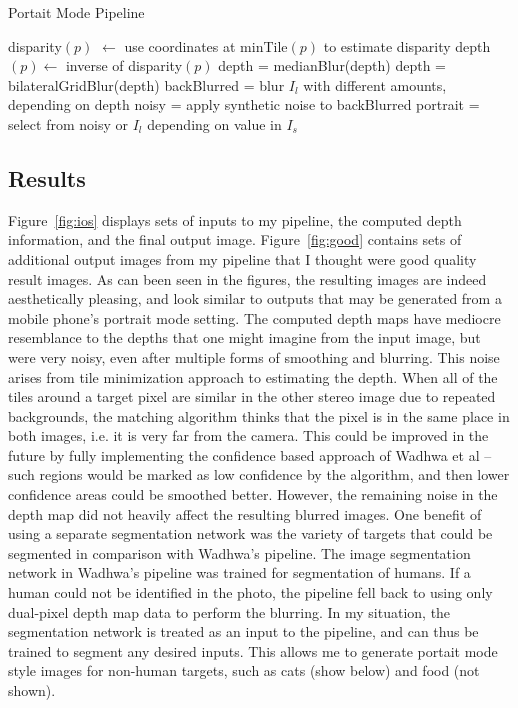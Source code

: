 \documentclass{article}
\begin{document}
\begin{algorithm}
\caption{Portait Mode Pipeline}
\label{alg:portrait}

    disparity$(p)$ $\gets$ use coordinates at minTile$(p)$ to estimate disparity \;
    depth$(p) \gets$ inverse of disparity$(p)$ \;
    depth = medianBlur(depth) \;
    depth = bilateralGridBlur(depth) \;
    backBlurred = blur $I_l$ with different amounts, depending on depth \;
    noisy = apply synthetic noise to backBlurred \;
    portrait = select from noisy or $I_l$ depending on value in $I_s$ \;
\end{algorithm}

\subsection{Results}

Figure~\ref{fig:ios} displays sets of inputs to my pipeline, the computed depth information, and the final output image.
%
Figure~\ref{fig:good} contains sets of additional output images from my pipeline that I thought were good quality result images.
%
As can been seen in the figures, the resulting images are indeed aesthetically pleasing, and look similar to outputs that may
be generated from a mobile phone's portrait mode setting.
%
The computed depth maps have mediocre resemblance to the depths that one might imagine from the input image, but were very noisy,
even after multiple forms of smoothing and blurring.
%
This noise arises from tile minimization approach to estimating the depth.
%
When all of the tiles around a target pixel are similar in the other stereo image due to repeated backgrounds, the matching
algorithm thinks that the pixel is in the same place in both images, i.e. it is very far from the camera.
%
This could be improved in the future by fully implementing the confidence based approach of Wadhwa et al -- such regions would be
marked as low confidence by the algorithm, and then lower confidence areas could be smoothed better.
%
However, the remaining noise in the depth map did not heavily affect the resulting blurred images.
%
One benefit of using a separate segmentation network was the variety of targets that could be segmented in comparison with Wadhwa's
pipeline.
%
The image segmentation network in Wadhwa's pipeline was trained for segmentation of humans.
%
If a human could not be identified in the photo, the pipeline fell back to using only dual-pixel depth map data to perform the
blurring.
%
In my situation, the segmentation network is treated as an input to the pipeline, and can thus be trained to segment any desired
inputs.
%
This allows me to generate portait mode style images for non-human targets, such as cats (show below) and food (not shown).
\end{document}

